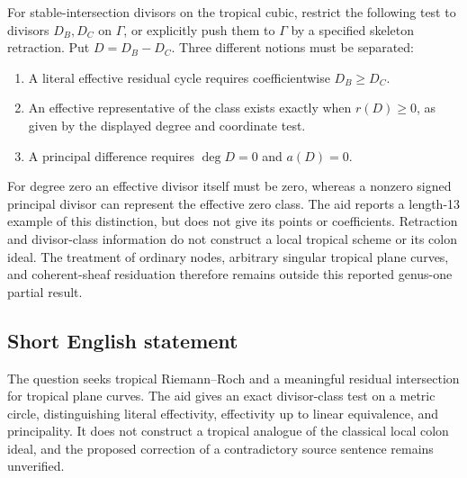 \documentclass[11pt]{article}
\begin{document}
For stable-intersection divisors on the tropical cubic, restrict the following test to divisors \(D_B,D_C\) on \(\Gamma\), or explicitly push them to \(\Gamma\) by a specified skeleton retraction. Put \(D=D_B-D_C\). Three different notions must be separated:
\begin{enumerate}
\item A literal effective residual cycle requires coefficientwise \(D_B\ge D_C\).
\item An effective representative of the class exists exactly when \(r(D)\ge0\), as given by the displayed degree and coordinate test.
\item A principal difference requires \(\deg D=0\) and \(a(D)=0\).
\end{enumerate}
For degree zero an effective divisor itself must be zero, whereas a nonzero signed principal divisor can represent the effective zero class. The aid reports a length-13 example of this distinction, but does not give its points or coefficients. Retraction and divisor-class information do not construct a local tropical scheme or its colon ideal. The treatment of ordinary nodes, arbitrary singular tropical plane curves, and coherent-sheaf residuation therefore remains outside this reported genus-one partial result.
\subsection{Short English statement}
The question seeks tropical Riemann--Roch and a meaningful residual intersection for tropical plane curves. The aid gives an exact divisor-class test on a metric circle, distinguishing literal effectivity, effectivity up to linear equivalence, and principality. It does not construct a tropical analogue of the classical local colon ideal, and the proposed correction of a contradictory source sentence remains unverified.
\end{document}
